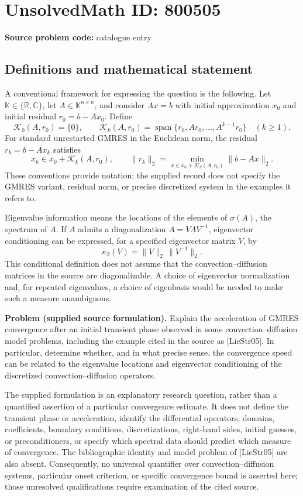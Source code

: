 \documentclass[11pt]{article}
\newcommand{\R}{\mathbb{R}}
\newcommand{\C}{\mathbb{C}}
\begin{document}
\section*{UnsolvedMath ID: 800505}
\textbf{Source problem code:} catalogue entry
\subsection{Definitions and mathematical statement}
A conventional framework for expressing the question is the following. Let \(\mathbb K\in\{\R,\C\}\), let \(A\in\mathbb K^{n\times n}\), and consider \(Ax=b\) with initial approximation \(x_0\) and initial residual \(r_0=b-Ax_0\). Define
\[
\mathcal K_0(A,r_0)=\{0\},\qquad
\mathcal K_k(A,r_0)=\operatorname{span}\{r_0,Ar_0,\ldots,A^{k-1}r_0\}\quad(k\geq1).
\]
For standard unrestarted GMRES in the Euclidean norm, the residual \(r_k=b-Ax_k\) satisfies
\[
x_k\in x_0+\mathcal K_k(A,r_0),\qquad
\|r_k\|_2=\min_{x\in x_0+\mathcal K_k(A,r_0)}\|b-Ax\|_2.
\]
These conventions provide notation; the supplied record does not specify the GMRES variant, residual norm, or precise discretized system in the examples it refers to.

Eigenvalue information means the locations of the elements of \(\sigma(A)\), the spectrum of \(A\). If \(A\) admits a diagonalization \(A=V\Lambda V^{-1}\), eigenvector conditioning can be expressed, for a specified eigenvector matrix \(V\), by
\[
\kappa_2(V)=\|V\|_2\,\|V^{-1}\|_2.
\]
This conditional definition does not assume that the convection--diffusion matrices in the source are diagonalizable. A choice of eigenvector normalization and, for repeated eigenvalues, a choice of eigenbasis would be needed to make such a measure unambiguous.

\textbf{Problem (supplied source formulation).} Explain the acceleration of GMRES convergence after an initial transient phase observed in some convection--diffusion model problems, including the example cited in the source as [LieStr05]. In particular, determine whether, and in what precise sense, the convergence speed can be related to the eigenvalue locations and eigenvector conditioning of the discretized convection--diffusion operators.

The supplied formulation is an explanatory research question, rather than a quantified assertion of a particular convergence estimate. It does not define the transient phase or acceleration, identify the differential operators, domains, coefficients, boundary conditions, discretizations, right-hand sides, initial guesses, or preconditioners, or specify which spectral data should predict which measure of convergence. The bibliographic identity and model problem of [LieStr05] are also absent. Consequently, no universal quantifier over convection--diffusion systems, particular onset criterion, or specific convergence bound is asserted here; those unresolved qualifications require examination of the cited source.
\end{document}

